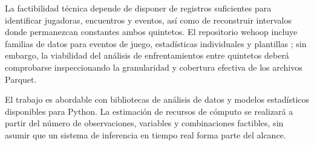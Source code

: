 La factibilidad técnica depende de disponer de registros suficientes para identificar jugadoras, encuentros y eventos, así como de reconstruir intervalos donde permanezcan constantes ambos quintetos. El repositorio wehoop incluye familias de datos para eventos de juego, estadísticas individuales y plantillas \cite{wehoopRepositorio}; sin embargo, la viabilidad del análisis de enfrentamientos entre quintetos deberá comprobarse inspeccionando la granularidad y cobertura efectiva de los archivos Parquet.

El trabajo es abordable con bibliotecas de análisis de datos y modelos estadísticos disponibles para Python. La estimación de recursos de cómputo se realizará a partir del número de observaciones, variables y combinaciones factibles, sin asumir que un sistema de inferencia en tiempo real forma parte del alcance.